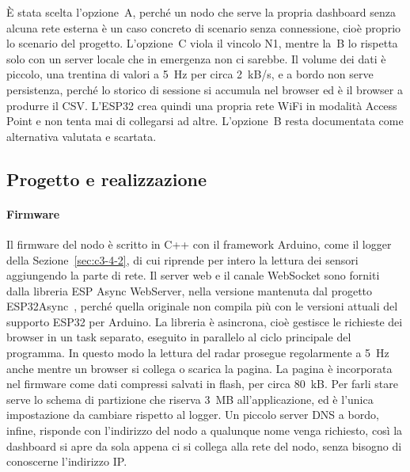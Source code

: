 È stata scelta l'opzione~A, perché un nodo che serve la propria dashboard senza alcuna
rete esterna è un caso concreto di scenario senza connessione, cioè proprio lo scenario
del progetto. L'opzione~C viola il vincolo N1, mentre la~B lo rispetta solo con un server
locale che in emergenza non ci sarebbe. Il volume dei dati è piccolo, una trentina di
valori a 5~Hz per circa 2~kB/s, e a bordo non serve persistenza, perché lo storico di
sessione si accumula nel browser ed è il browser a produrre il CSV. L'ESP32 crea quindi una
propria rete WiFi in modalità Access Point e non tenta mai di collegarsi ad altre.
L'opzione~B resta documentata come alternativa valutata e scartata.

\subsection{Progetto e realizzazione}
\label{sec:webui-progetto}
\label{sec:webui-piano}
\label{sec:webui-lezioni}
\label{sec:webui-riferimenti}

\paragraph{Firmware} Il firmware del nodo è scritto in C++ con il framework Arduino, come
il logger della Sezione~\ref{sec:c3-4-2}, di cui riprende per intero la lettura dei sensori
aggiungendo la parte di rete. Il server web e il canale WebSocket sono forniti dalla
libreria ESP Async WebServer, nella versione mantenuta dal progetto
ESP32Async~\cite{esp32async}, perché quella originale non compila più con le versioni
attuali del supporto ESP32 per Arduino. La libreria è asincrona, cioè gestisce le
richieste dei browser in un task separato, eseguito in parallelo al ciclo principale del
programma. In questo modo la lettura del radar prosegue regolarmente a 5~Hz anche mentre
un browser si collega o scarica la pagina. La pagina è incorporata nel firmware come dati
compressi salvati in flash, per circa 80~kB. Per farli stare serve lo schema di partizione
che riserva 3~MB all'applicazione, ed è l'unica impostazione da cambiare rispetto al
logger. Un piccolo server DNS a bordo, infine, risponde con l'indirizzo del nodo a
qualunque nome venga richiesto, così la dashboard si apre da sola appena ci si collega alla
rete del nodo, senza bisogno di conoscerne l'indirizzo IP.


